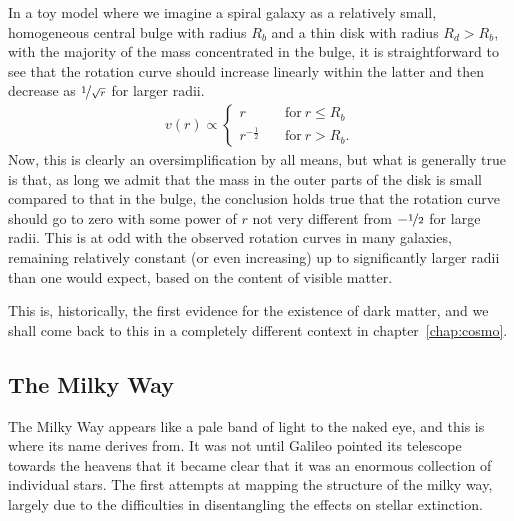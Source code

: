 \begin{marginfigure}
	
	\caption{Toy model for a galaxy rotation curve~\eqref{eq:galaxy_rotation}, based
		on the assumption that the mass of the galaxy is concentrated in the bulge.}
	\label{fig:galaxy_rotation}
\end{marginfigure}

In a toy model where we imagine a spiral galaxy as a relatively small, homogeneous
central bulge with radius $R_b$ and a thin disk with radius $R_d > R_b$, with the
majority of the mass concentrated in the bulge, it is straightforward to see that
the rotation curve should increase linearly within the latter and then decrease
as $\nicefrac{1}{\sqrt{r}}$ for larger radii.
\begin{align}\label{eq:galaxy_rotation}
  v(r) \propto \begin{cases}
    r & \quad\text{for}~r \leq R_b\\
    r^{-\frac{1}{2}} & \quad\text{for}~r > R_b.
  \end{cases}
\end{align}
Now, this is clearly an oversimplification by all means, but what is generally true
is that, as long we admit that the mass in the outer parts of the disk is small
compared to that in the bulge, the conclusion holds true that the rotation curve
should go to zero with some power of $r$ not very different from $-\nicefrac{1}{2}$
for large radii. This is at odd with the observed rotation curves in many galaxies,
remaining relatively constant (or even increasing) up to significantly larger radii
than one would expect, based on the content of visible matter.

This is, historically, the first evidence for the existence of dark matter, and
we shall come back to this in a completely different context in chapter~\ref{chap:cosmo}.


\subsection{The Milky Way}
\label{sec:milky_way}

The Milky Way appears like a pale band of light to the naked eye, and this is where
its name derives from. It was not until Galileo pointed its telescope towards the
heavens that it became clear that it was an enormous collection of individual
stars. The first attempts at mapping the structure of the milky way, largely due
to the difficulties in disentangling the effects on stellar extinction.

